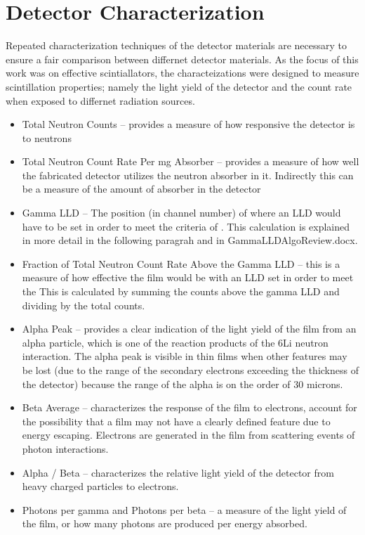 \chapter{Detector Characterization}
\label{chap:DetChar}
Repeated characterization techniques of the detector materials are necessary to ensure a fair comparison between differnet detector materials.
As the focus of this work was on effective scintiallators, the characteizations were designed to measure scintillation properties; namely the light yield of the detector and the count rate when exposed to differnet radiation sources.

\begin{itemize}
  \item Total Neutron Counts – provides a measure of how responsive the detector is to neutrons
  \item  Total Neutron Count Rate Per mg Absorber – provides a measure of how well the fabricated detector utilizes the neutron absorber in it. Indirectly this can be a measure of the amount of absorber in the detector
  \item  Gamma LLD – The position (in channel number) of where an LLD would have to be set in order to meet the criteria of . This calculation is explained in more detail in the following paragrah and in GammaLLDAlgoReview.docx.
  \item  Fraction of Total Neutron Count Rate Above the Gamma LLD – this is a measure of how effective the film would be with an LLD set in order to meet the This is calculated by summing the counts above the gamma LLD and dividing by the total counts.
  \item  Alpha Peak – provides a clear indication of the light yield of the film from an alpha particle, which is one of the reaction products of the 6Li neutron interaction. The alpha peak is visible in thin films when other features may be lost (due to the range of the secondary electrons exceeding the thickness of the detector) because the range of the alpha is on the order of 30 microns.
  \item  Beta Average – characterizes the response of the film to electrons, account for the possibility that a film may not have a clearly defined feature due to energy escaping. Electrons are generated in the film from scattering events of photon interactions.
  \item  Alpha / Beta – characterizes the relative light yield of the detector from heavy charged particles to electrons.
  \item  Photons per gamma and Photons per beta – a measure of the light yield of the film, or how many photons are produced per energy absorbed.

\end{itemize}

